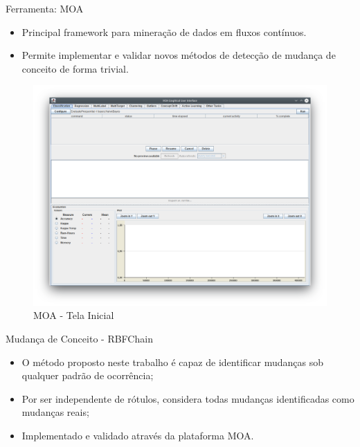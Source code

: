\documentclass[10pt]{beamer}
\begin{document}
\begin{frame}{Ferramenta: MOA}
    \begin{itemize}
        \item<1 -> Principal framework para mineração de dados em fluxos contínuos.
        \item<1 -> Permite implementar e validar novos métodos de detecção de mudança de conceito de forma trivial.
    \end{itemize}
    \begin{figure}[H]
        \begin{center}
            \includegraphics[scale=0.2]{imagens/moa.png}
            \caption{MOA - Tela Inicial}
            \label{fig:moa}
        \end{center}
    \end{figure}
\end{frame}

\begin{frame}{Mudança de Conceito - RBFChain}
    \begin{itemize}
        \item<1 -> O método proposto neste trabalho é capaz de identificar mudanças \alert{sob qualquer padrão de ocorrência};
        \item<2 -> Por ser independente de rótulos, considera todas mudanças identificadas como \alert{mudanças reais};
        \item<3 -> Implementado e validado através da plataforma MOA.
    \end{itemize}
\end{frame}
\end{document}
